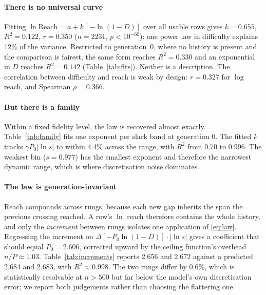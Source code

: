 \documentclass[conference]{IEEEtran}
\theoremstyle{definition}
\begin{document}
\paragraph{There is no universal curve} Fitting
$\ln\mathrm{Reach}=a+k\,[-\ln(1-D)]$ over all usable rows gives
$k=0.655$, $R^2=0.122$, $r=0.350$ ($n=2231$, $p<10^{-60}$): one power law in
difficulty explains \num{12}\% of the variance. Restricted to generation~0, where
no history is present and the comparison is fairest, the same form reaches
$R^2=0.330$ and an exponential in $D$ reaches $R^2=0.142$
(Table~\ref{tab:fits}). Neither is a description. The correlation between
difficulty and reach is weak by design: $r=0.327$ for $\log$ reach, and Spearman
$\rho=0.366$.

\begin{table}[t]
\centering
\caption{Rival fitted forms at generation 0, where no history is present
($n$ rows as listed). Lower AIC is better.}
\label{tab:fits}
\footnotesize

\end{table}

\paragraph{But there is a family} Within a fixed fidelity level, the law is
recovered almost exactly. Table~\ref{tab:family} fits one exponent per slack band
at generation 0. The fitted $k$ tracks $\gamma P_0\lvert\ln s\rvert$ to within
\num{4.4}\% across the range, with $R^2$ from \num{0.70} to \num{0.996}. The weakest
bin ($s=0.977$) has the smallest exponent and therefore the narrowest dynamic
range, which is where discretisation noise dominates.

\begin{table}[t]
\centering
\caption{The exponent is a function of fidelity, not of difficulty. One fit per
slack band, generation 0.}
\label{tab:family}
\footnotesize

\end{table}

\paragraph{The law is generation-invariant} Reach compounds across rungs, because
each new gap inherits the span the previous crossing reached. A row's $\ln$
reach therefore contains the whole history, and only the \emph{increment} between
rungs isolates one application of \eqref{eq:law}. Regressing the increment on
$\Delta[-P_0\ln(1-D)]\cdot\lvert\ln s\rvert$ gives a coefficient that should equal
$P_0=2.606$, corrected upward by the ceiling function's overhead
$n/P\approx 1.03$. Table~\ref{tab:increments} reports \num{2.656} and \num{2.672}
against a predicted \num{2.684} and \num{2.683}, with $R^2\approx0.998$. The two
rungs differ by \num{0.6}\%, which is statistically resolvable at $n>500$ but far
below the model's own discretisation error; we report both judgements rather than
choosing the flattering one.
\end{document}
